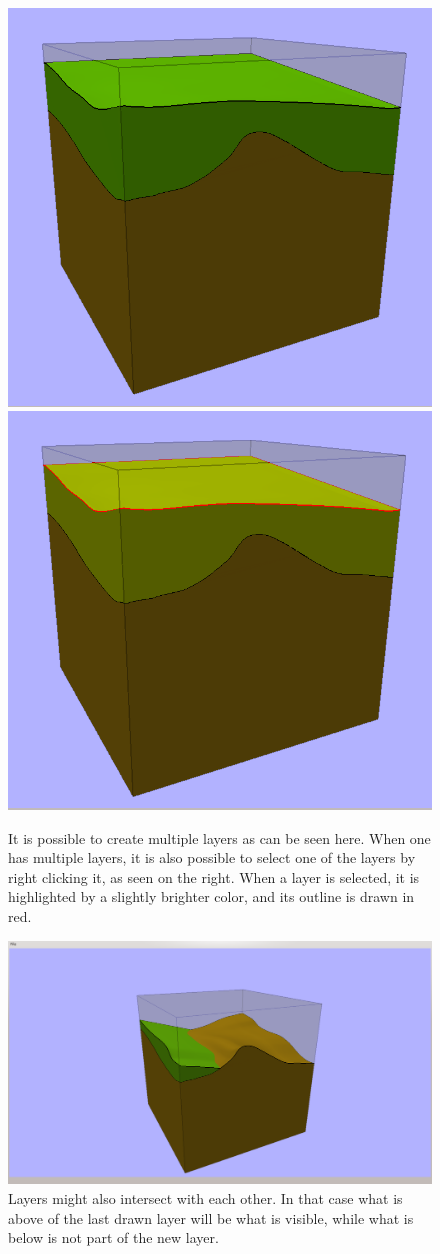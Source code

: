 \documentclass[a4paper,12pt]{report}
\begin{document}
\begin{figure}
 \centering
\includegraphics[width=.3\linewidth]{thesis/results/simpleLayerNew.png}
\includegraphics[width=.3\linewidth]{thesis/results/simpleLayerNewMarked.png}
 \caption{It is possible to create multiple layers as can be seen here. When one has multiple layers, it is also possible to select one of the layers by right clicking it, as seen on the right. When a layer is selected, it is highlighted by a slightly brighter color, and its outline is drawn in red.}
 \label{fig:layerNew}
\end{figure}

\begin{figure}
 \centering
\includegraphics[trim = 90mm 7mm 80mm 30mm, clip,width=.3\linewidth]{thesis/results/simpleLayerIntersect.png}
 \caption{Layers might also intersect with each other. In that case what is above of the last drawn layer will be what is visible, while what is below is not part of the new layer.}
 \label{fig:layerIntersect}
\end{figure}
\end{document}
